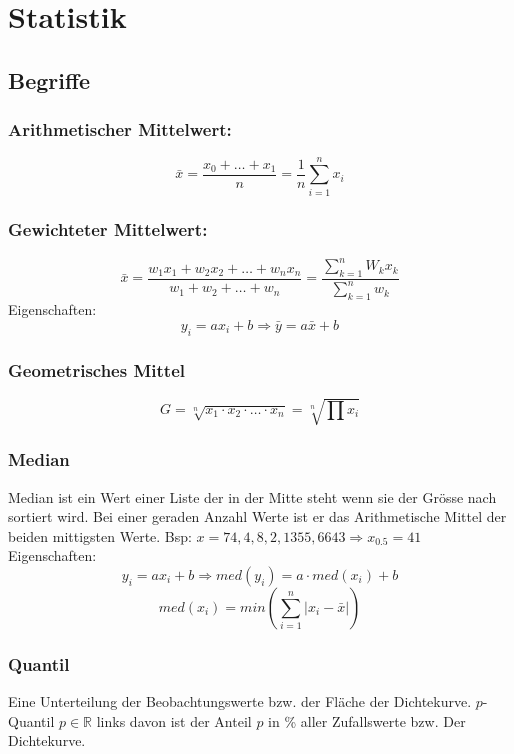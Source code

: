 \documentclass[margin=normal]{tex/hsrzf}
\begin{document}
\section{Statistik}
\begin{multicols}{2}

    \subsection{Begriffe}
    \subsubsection*{Arithmetischer Mittelwert:}
    $$\bar{x} = \frac{x_0 + \dots + x_1}{n} = \frac{1}{n} \sum_{i=1}^n x_i $$
    \subsubsection*{Gewichteter Mittelwert:}
    $$\bar{x} = \frac{w_1x_1 + w_2x_2 + \dots + w_nx_n}{w_1 + w_2 + \dots + w_n}
        = \frac{\sum _{k=1}^n W_kx_k}{\sum_{k=1}^n w_k}$$
    Eigenschaften:
    $$y_i = ax_i + b \Rightarrow \bar{y} = a\bar{x} + b$$

    \subsubsection*{Geometrisches Mittel}
    $$G= \sqrt[n]{x_1\cdot x_2\cdot\dots\cdot x_n} = \sqrt[n]{\prod x_i}$$

    \subsubsection*{Median}
    Median ist ein Wert einer Liste der in der Mitte steht wenn sie der Grösse nach sortiert wird.
    Bei einer geraden Anzahl Werte ist er das Arithmetische Mittel der beiden mittigsten Werte.
    Bsp: $x = {74, 4, 8, 2, 1355, 6643} \Rightarrow x_{0.5} = 41$ \\
    Eigenschaften:
    $$y_i = ax_i + b \Rightarrow med(y_i) = a \cdot med(x_i) + b$$
    $$ med(x_i) = min(\sum _{i=1} ^n |x_i - \bar{x}|)$$

    \subsubsection*{Quantil}
    Eine Unterteilung der Beobachtungswerte bzw. der Fläche der Dichtekurve.
    $p$-Quantil $p \in \mathbb{R}$ links davon ist der Anteil $p$ in \% aller Zufallswerte bzw. Der Dichtekurve.




\end{multicols}
\end{document}
